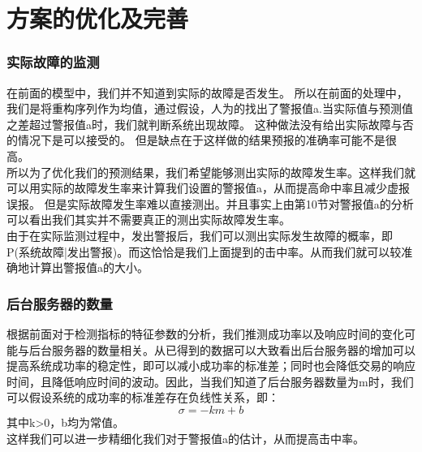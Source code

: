 \documentclass[a4paper]{article}
\begin{document}
\part{方案的优化及完善}
\section{实际故障的监测}
\indent 在前面的模型中，我们并不知道到实际的故障是否发生。
所以在前面的处理中，我们是将重构序列作为均值，通过假设，人为的找出了警报值a.当实际值与预测值之差超过警报值a时，我们就判断系统出现故障。
这种做法没有给出实际故障与否的情况下是可以接受的。
但是缺点在于这样做的结果预报的准确率可能不是很高。 \\
\indent 所以为了优化我们的预测结果，我们希望能够测出实际的故障发生率。这样我们就可以用实际的故障发生率来计算我们设置的警报值a，从而提高命中率且减少虚报误报。
但是实际故障发生率难以直接测出。并且事实上由第10节对警报值a的分析可以看出我们其实并不需要真正的测出实际故障发生率。\\
\indent 由于在实际监测过程中，发出警报后，我们可以测出实际发生故障的概率，即P(系统故障|发出警报)。而这恰恰是我们上面提到的击中率。从而我们就可以较准确地计算出警报值a的大小。
\section{后台服务器的数量}
\indent 根据前面对于检测指标的特征参数的分析，我们推测成功率以及响应时间的变化可能与后台服务器的数量相关。从已得到的数据可以大致看出后台服务器的增加可以提高系统成功率的稳定性，即可以减小成功率的标准差；同时也会降低交易的响应时间，且降低响应时间的波动。因此，当我们知道了后台服务器数量为m时，我们可以假设系统的成功率的标准差存在负线性关系，即：
\begin{equation}
\sigma=-km+b
\end{equation}
其中k>0，b均为常值。\\
这样我们可以进一步精细化我们对于警报值a的估计，从而提高击中率。	
\end{document}
